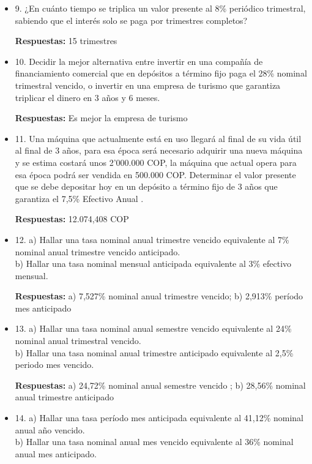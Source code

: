 \begin{itemize}
       \textbf{Respuestas:} 28,07 meses
       \medskip

 \item 9. ¿En cuánto tiempo se triplica un valor presente al 8\% periódico trimestral, sabiendo que el interés solo se paga por trimestres completos?
 
       \textbf{Respuestas:} 15 trimestres 
       \medskip

 \item 10. Decidir la mejor alternativa entre invertir en una compañía de financiamiento comercial que en depósitos a término fijo paga el 28\% nominal trimestral vencido, o invertir en una empresa de turismo que garantiza triplicar el dinero en 3 años y 6 meses.
 
       \textbf{Respuestas:} Es mejor la empresa de turismo
       \medskip

 \item 11. Una máquina que actualmente está en uso llegará al final de su vida útil  al final de 3 años, para esa época será necesario adquirir una nueva máquina y se estima costará unos 2’000.000 COP, la máquina que actual opera para esa época podrá ser vendida en 500.000 COP. Determinar el  valor presente que se debe depositar hoy en un depósito a término fijo de 3 años que garantiza el 7,5\% Efectivo Anual .
 
  \textbf{Respuestas:}  12.074,408 COP
       \medskip

 \item 12. a) Hallar una tasa nominal anual trimestre vencido equivalente al 7\% nominal anual trimestre vencido anticipado.\\
 b) Hallar una tasa nominal mensual anticipada equivalente al 3\% efectivo mensual.
 
       \textbf{Respuestas:} a) 7,527\% nominal anual trimestre vencido; 
       b) 2,913\% período mes anticipado\\ 
       \medskip

 \item 13. a) Hallar una tasa nominal anual semestre vencido equivalente al 24\% nominal anual trimestral vencido.\\
 b) Hallar una tasa nominal anual trimestre anticipado equivalente al 2,5\% periodo mes vencido.
 
       \textbf{Respuestas:} a) 24,72\% nominal anual semestre vencido  ;
     b) 28,56\%  nominal anual trimestre anticipado
       \medskip

 \item 14.  a) Hallar una tasa período mes anticipada equivalente al 41,12\% nominal anual año vencido.\\
  b) Hallar una tasa nominal anual mes vencido equivalente al 36\% nominal anual mes anticipado.
  

\end{itemize}
